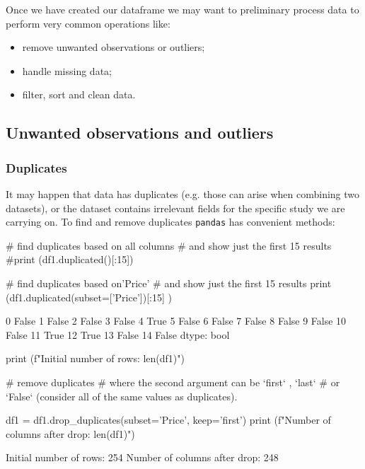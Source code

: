 Once we have created our dataframe we may want to preliminary process data to perform very common operations like:

\begin{itemize}
	\tightlist
\item remove unwanted observations or outliers;
\item handle missing data;
\item filter, sort and clean data.
\end{itemize}

\subsection{Unwanted observations and outliers}

\subsubsection{Duplicates}

It may happen that data has duplicates (e.g. those can arise when combining two datasets), or the dataset contains irrelevant fields for the specific study we are carrying on. To find and remove duplicates \texttt{pandas} has convenient methods:

\begin{ipython}
# find duplicates based on all columns
# and show just the first 15 results
#print (df1.duplicated()[:15])

# find duplicates based on'Price'
# and show just the first 15 results
print (df1.duplicated(subset=['Price'])[:15] )
\end{ipython}
\begin{ioutput}
0     False
1     False
2     False
3     False
4      True
5     False
6     False
7     False
8     False
9     False
10    False
11     True
12     True
13    False
14    False
dtype: bool
\end{ioutput}

\begin{ipython}
print (f"Initial number of rows: {len(df1)}")

# remove duplicates
# where the second argument can be `first` , `last`
# or `False` (consider all of the same values as duplicates).

df1 = df1.drop_duplicates(subset='Price', keep='first')
print (f"Number of columns after drop: {len(df1)}")
\end{ipython}
\begin{ioutput}
Initial number of rows: 254
Number of columns after drop: 248
\end{ioutput}

